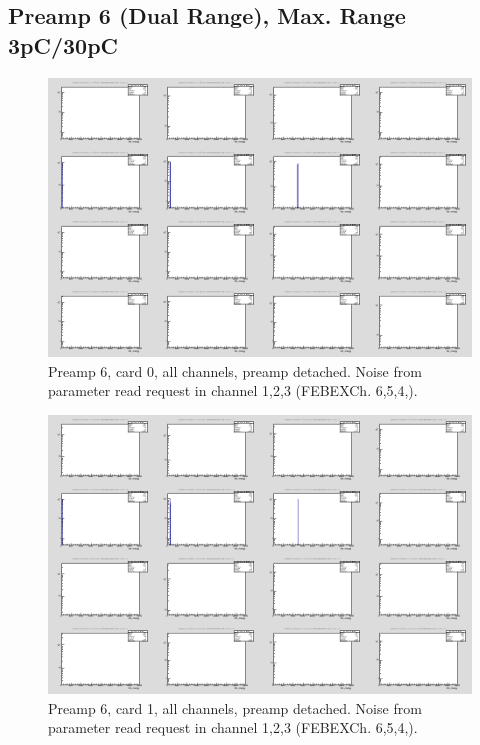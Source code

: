\documentclass{report}
\begin{document}
\newpage
\clearpage


\subsection{Preamp 6 (Dual Range), Max. Range 3pC/30pC}
\begin{figure}[!htb]
  \includegraphics[width=\linewidth]{rc_bus_test/preamp6_card0_gamma_all.png}
  \caption{Preamp 6, card 0, all channels, preamp detached. Noise from parameter read request in channel 1,2,3 (FEBEXCh. 6,5,4,).}
\end{figure}
\begin{figure}[!htb]
  \includegraphics[width=\linewidth]{rc_bus_test/preamp6_card1_gamma_all.png}
  \caption{Preamp 6, card 1, all channels, preamp detached. Noise from parameter read request in channel 1,2,3 (FEBEXCh. 6,5,4,).}
\end{figure}
\end{document}
